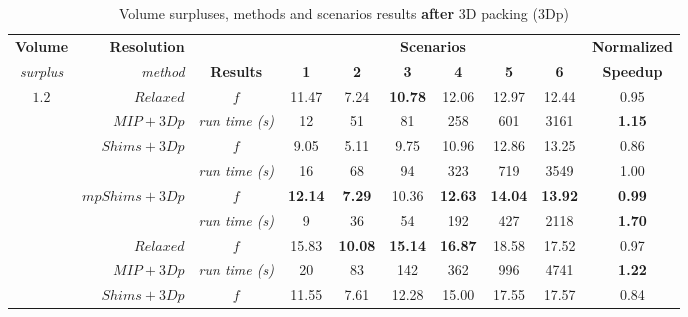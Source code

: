 \documentclass[preprint,authoryear]{elsarticle}
\begin{document}
\vspace{2.0mm}
\begin{table}[H]
	\centering
	\caption{Volume surpluses, methods and scenarios results {\bf after} 3D packing (3Dp)}  \label{tab:results2}
	\footnotesize
	\begin{tabular}{crcccccccc}
		\toprule
		{\bf Volume}     &{\bf Resolution}&                    &\multicolumn{6}{c}{\bf Scenarios}                                                   &{\bf Normalized}\\
		\cmidrule{4-9}		
		{\it surplus}    &{\it method}    & {\bf Results}      &{\bf 1}    &{\bf 2}    &{\bf 3}    &{\bf 4}    &{\bf 5}    &{\bf 6}    &{\bf Speedup} \\
		\toprule
		\multirow{7}{*}{$1.2$}&$Relaxed$  & $f$                &   11.47   &    7.24   &{\bf 10.78}&     12.06 &     12.97 &    12.44  &     0.95 \\%
		&                       $MIP+3Dp$     & {\it run time (s)} &     12     &     51    &     81    &     258   &      601  &     3161  &{\bf 1.15}\\%
		\cmidrule{2-10}		                       
		&\multirow{2}{*}{ $Shims+3Dp$}        & $f$                &    9.05   &   5.11    &   9.75    &   10.96   &   12.86   &   13.25   &     0.86 \\%
		&                                 & {\it run time (s)} &     16    &     68    &     94    &    323    &    719    &    3549   &     1.00 \\%
		\cmidrule{2-10}		                       
		&\multirow{2}{*}{ $mpShims+3Dp$}      & $f$                &{\bf 12.14}&{\bf 7.29} &   10.36   &{\bf 12.63}&{\bf 14.04}&{\bf 13.92}&{\bf 0.99}\\%
		&                                 & {\it run time (s)} &     9     &     36    &     54    &     192   &     427   &    2118   &{\bf 1.70}\\%
		\toprule		
		\multirow{7}{*}{$1.5$}&$Relaxed$  & $f$                &     15.83 &{\bf 10.08}&{\bf 15.14}&{\bf 16.87}&     18.58 &     17.52 &     0.97 \\%
		&                      $MIP+3Dp$      & {\it run time (s)} &    20     &     83    &     142   &     362   &     996   &     4741  &{\bf 1.22} \\%
		\cmidrule{2-10}		                       
		&\multirow{2}{*}{ $Shims+3Dp$}        & $f$                &   11.55   &   7.61    &   12.28   &   15.00   &   17.55   &   17.57   &     0.84  \\%

\end{tabular}
\end{table}
\end{document}
